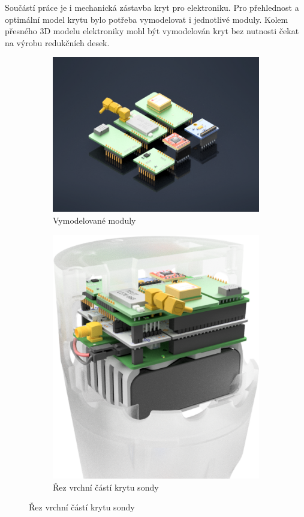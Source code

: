 \documentclass[twoside]{ctuthesis}
\theoremstyle{plain}
\theoremstyle{definition}
\theoremstyle{note}
\begin{document}
	Součástí práce je i mechanická zástavba kryt pro elektroniku. Pro přehlednost a optimální model krytu bylo potřeba vymodelovat i jednotlivé moduly. Kolem přesného 3D modelu elektroniky mohl být vymodelován kryt bez nutnosti čekat na výrobu redukčních desek.
	\begin{figure}[hbtp]
		\centering
		\begin{subfigure}{.5\textwidth}
			\centering
			\includegraphics[height=.7\linewidth]{Figures/modules_assembly.png} 
			\caption{Vymodelované moduly}
			\label{fig:modules:assembly}
		\end{subfigure}%
		\begin{subfigure}{.5\textwidth}
			\centering
			\includegraphics[height=.7\linewidth]{Figures/ALL_rez_white.png}
			\caption{Řez vrchní částí krytu sondy}
			\label{fig:all:rez}
		\end{subfigure}
		\label{fig:shields}
	\end{figure}
\end{document}
